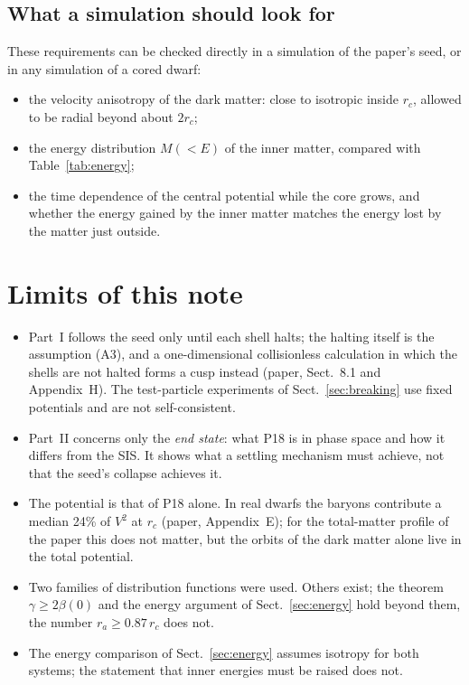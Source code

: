 \documentclass[11pt,a4paper]{article}
\newcommand{\rc}{r_c}
\begin{document}
\subsection{What a simulation should look for}
These requirements can be checked directly in a simulation of the paper's seed, or
in any simulation of a cored dwarf:
\begin{itemize}
\item the velocity anisotropy of the dark matter: close to isotropic inside $\rc$,
  allowed to be radial beyond about $2\rc$;
\item the energy distribution $M(<E)$ of the inner matter, compared with
  Table~\ref{tab:energy};
\item the time dependence of the central potential while the core grows, and
  whether the energy gained by the inner matter matches the energy lost by the
  matter just outside.
\end{itemize}

\section{Limits of this note}\label{sec:limits}
\begin{itemize}
\item Part~I follows the seed only until each shell halts; the halting itself is
  the assumption (A3), and a one-dimensional collisionless calculation in which the
  shells are not halted forms a cusp instead (paper, Sect.~8.1 and Appendix~H). The
  test-particle experiments of Sect.~\ref{sec:breaking} use fixed potentials and are
  not self-consistent.
\item Part~II concerns only the \emph{end state}: what P18 is in phase space and
  how it differs from the SIS. It shows what a settling mechanism must achieve, not
  that the seed's collapse achieves it.
\item The potential is that of P18 alone. In real dwarfs the baryons contribute a
  median 24\% of $V^2$ at $\rc$ (paper, Appendix~E); for the total-matter profile of
  the paper this does not matter, but the orbits of the dark matter alone live in the
  total potential.
\item Two families of distribution functions were used. Others exist; the theorem
  $\gamma\ge2\beta(0)$ and the energy argument of Sect.~\ref{sec:energy} hold beyond
  them, the number $r_a\ge0.87\,\rc$ does not.
\item The energy comparison of Sect.~\ref{sec:energy} assumes isotropy for both
  systems; the statement that inner energies must be raised does not.
\end{itemize}
\end{document}
